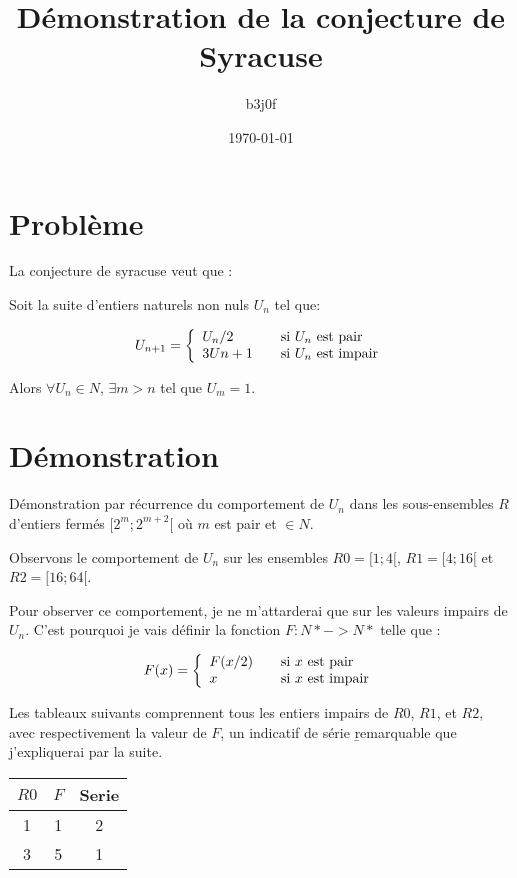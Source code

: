 \documentclass{book}
\title{D\'emonstration de la conjecture de Syracuse}
\author{b3j0f}
\date{\today}
\begin{document}
\label{start}

\maketitle

\section{Problème}

La conjecture de syracuse veut que :

Soit la suite d'entiers naturels non nuls $U_n$ tel que:

\[U_{n+1} = \left\{
\begin{array}{l l}
  U_n/2 & \quad \text{si $U_n$ est pair}\\
  3Un+1 & \quad \text{si $U_n$ est impair}\\ \end{array} \right. \]

Alors $\forall U_n \in N$, $\exists m > n$ tel que $U_m = 1$.

\section{D\'emonstration}

D\'emonstration par r\'ecurrence du comportement de $U_n$ dans les sous-ensembles $R$ d'entiers ferm\'es $[2^m; 2^{m+2}[$ o\`u $m$ est pair et $\in N$.

Observons le comportement de $U_n$ sur les ensembles $R0=[1; 4[$, $R1=[4; 16[$ et $R2=[16; 64[$.

Pour observer ce comportement, je ne m'attarderai que sur les valeurs impairs de $U_n$. C'est pourquoi je vais d\'efinir la fonction $F: N* -> N*$ telle que :

\[F(x) = \left\{
\begin{array}{l l}
  F(x/2) & \quad \text{si $x$ est pair}\\
  x & \quad \text{si $x$ est impair}\\ \end{array} \right. \]

Les tableaux suivants comprennent tous les entiers impairs de $R0$, $R1$, et $R2$, avec respectivement la valeur de $F$, un indicatif de série \b{remarquable} que j'expliquerai par la suite.

\begin{tabular}{|c|c|c|}
	\hline
	$R0$ & $F$ & Serie \\
	\hline
	1 & 1 & 2 \\
	\hline
	3 & 5 & 1 \\
	\hline
\end{tabular}
\end{document}
